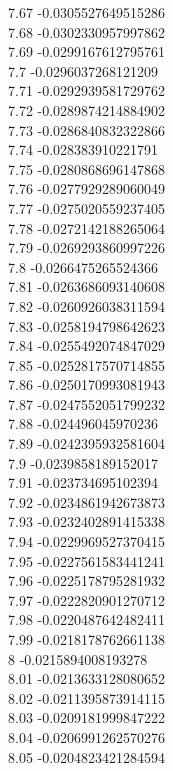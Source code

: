 {7.67	-0.0305527649515286\\
7.68	-0.0302330957997862\\
7.69	-0.0299167612795761\\
7.7	-0.0296037268121209\\
7.71	-0.0292939581729762\\
7.72	-0.0289874214884902\\
7.73	-0.0286840832322866\\
7.74	-0.028383910221791\\
7.75	-0.0280868696147868\\
7.76	-0.0277929289060049\\
7.77	-0.0275020559237405\\
7.78	-0.0272142188265064\\
7.79	-0.0269293860997226\\
7.8	-0.0266475265524366\\
7.81	-0.0263686093140608\\
7.82	-0.0260926038311594\\
7.83	-0.0258194798642623\\
7.84	-0.0255492074847029\\
7.85	-0.0252817570714855\\
7.86	-0.0250170993081943\\
7.87	-0.0247552051799232\\
7.88	-0.024496045970236\\
7.89	-0.0242395932581604\\
7.9	-0.0239858189152017\\
7.91	-0.023734695102394\\
7.92	-0.0234861942673873\\
7.93	-0.0232402891415338\\
7.94	-0.0229969527370415\\
7.95	-0.0227561583441241\\
7.96	-0.0225178795281932\\
7.97	-0.0222820901270712\\
7.98	-0.0220487642482411\\
7.99	-0.0218178762661138\\
8	-0.0215894008193278\\
8.01	-0.0213633128080652\\
8.02	-0.0211395873914115\\
8.03	-0.0209181999847222\\
8.04	-0.0206991262570276\\
8.05	-0.0204823421284594\\
}

